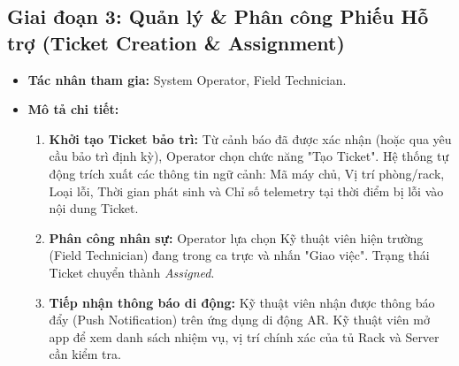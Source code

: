 \subsection{Giai đoạn 3: Quản lý \& Phân công Phiếu Hỗ trợ (Ticket Creation \& Assignment)}
\begin{itemize}
    \item \textbf{Tác nhân tham gia:} System Operator, Field Technician.
    \item \textbf{Mô tả chi tiết:}
    \begin{enumerate}
        \item \textbf{Khởi tạo Ticket bảo trì:} Từ cảnh báo đã được xác nhận (hoặc qua yêu cầu bảo trì định kỳ), Operator chọn chức năng "Tạo Ticket". Hệ thống tự động trích xuất các thông tin ngữ cảnh: Mã máy chủ, Vị trí phòng/rack, Loại lỗi, Thời gian phát sinh và Chỉ số telemetry tại thời điểm bị lỗi vào nội dung Ticket.
        \item \textbf{Phân công nhân sự:} Operator lựa chọn Kỹ thuật viên hiện trường (Field Technician) đang trong ca trực và nhấn "Giao việc". Trạng thái Ticket chuyển thành \textit{Assigned}.
        \item \textbf{Tiếp nhận thông báo di động:} Kỹ thuật viên nhận được thông báo đẩy (Push Notification) trên ứng dụng di động AR. Kỹ thuật viên mở app để xem danh sách nhiệm vụ, vị trí chính xác của tủ Rack và Server cần kiểm tra.
    \end{enumerate}
\end{itemize}

